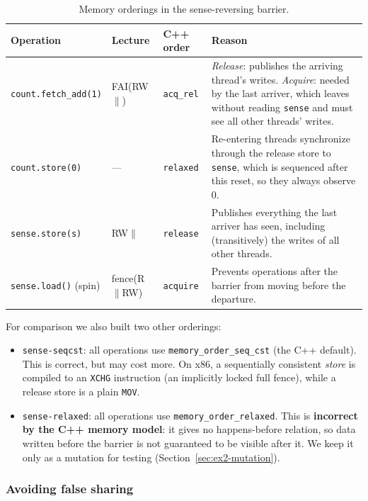 \begin{table}[H]
\centering
\caption{Memory orderings in the sense-reversing barrier.}
\label{tab:ex2-orders}
\small
\begin{tabular}{p{3.7cm} p{2.0cm} p{1.7cm} p{6.6cm}}
\toprule
\textbf{Operation} & \textbf{Lecture} & \textbf{C++ order} & \textbf{Reason} \\
\midrule
\texttt{count.fetch\_add(1)} & FAI(RW$\|$) & \texttt{acq\_rel} &
  \emph{Release}: publishes the arriving thread's writes. \emph{Acquire}:
  needed by the last arriver, which leaves without reading \texttt{sense}
  and must see all other threads' writes. \\
\texttt{count.store(0)} & --- & \texttt{relaxed} &
  Re-entering threads synchronize through the release store to
  \texttt{sense}, which is sequenced after this reset, so they always
  observe $0$. \\
\texttt{sense.store(s)} & RW$\|$ & \texttt{release} &
  Publishes everything the last arriver has seen, including (transitively)
  the writes of all other threads. \\
\texttt{sense.load()} (spin) & fence(R$\|$RW) & \texttt{acquire} &
  Prevents operations after the barrier from moving before the departure. \\
\bottomrule
\end{tabular}
\end{table}

For comparison we also built two other orderings:

\begin{itemize}
    \item \texttt{sense-seqcst}: all operations use
          \texttt{memory\_order\_seq\_cst} (the C++ default). This is
          correct, but may cost more. On x86, a sequentially consistent
          \emph{store} is compiled to an \texttt{XCHG} instruction (an
          implicitly locked full fence), while a release store is a plain
          \texttt{MOV}.
    \item \texttt{sense-relaxed}: all operations use
          \texttt{memory\_order\_relaxed}. This is \textbf{incorrect by the
          C++ memory model}: it gives no happens-before relation, so data
          written before the barrier is not guaranteed to be visible after
          it. We keep it only as a mutation for testing
          (Section~\ref{sec:ex2-mutation}).
\end{itemize}

\subsubsection{Avoiding false sharing}


